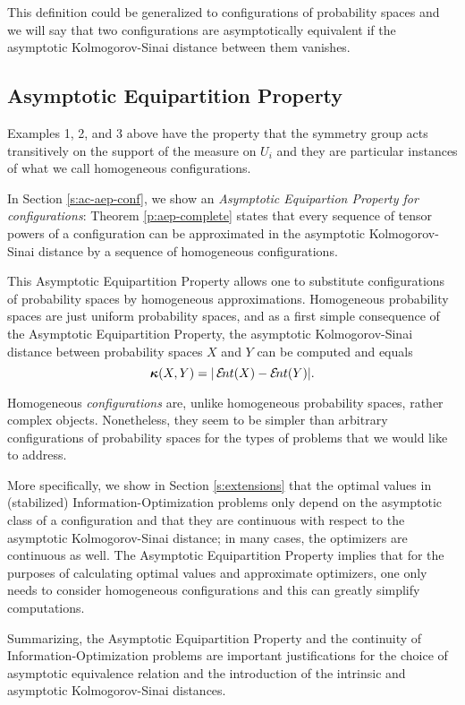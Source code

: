 This definition could be generalized to configurations of probability
spaces and we will say that two configurations are asymptotically
equivalent if the asymptotic Kolmogorov-Sinai distance between them
vanishes.

\subsection{Asymptotic Equipartition Property}\label{s:intro-aep}  
Examples 1, 2, and 3 above have the property that the symmetry group
acts transitively on the support of the measure on $U_{i}$ and they
are particular instances of what we call homogeneous configurations.

In Section \ref{s:ac-aep-conf}, we show an \emph{Asymptotic
  Equipartion Property for configurations}: Theorem
\ref{p:aep-complete} states that every sequence of tensor powers of a
configuration can be approximated in the asymptotic Kolmogorov-Sinai
distance by a sequence of homogeneous configurations.

This Asymptotic Equipartition Property allows one to substitute
configurations of probability spaces by homogeneous approximations.
Homogeneous probability spaces are just uniform probability spaces,
and as a first simple consequence of the Asymptotic Equipartition
Property, the asymptotic Kolmogorov-Sinai distance between probability
spaces $X$ and $Y$ can be computed and equals
\[
\aikd(X , Y) = |\ent(X) - \ent(Y)|.
\]

Homogeneous \emph{configurations} are, unlike homogeneous probability
spaces, rather complex objects.  Nonetheless, they seem to be simpler
than arbitrary configurations of probability spaces for the types of
problems that we would like to address.

More specifically, we show in Section \ref{s:extensions} that the
optimal values in (stabilized) Information-Optimization problems only
depend on the asymptotic class of a configuration and that they are
continuous with respect to the asymptotic Kolmogorov-Sinai distance;
in many cases, the optimizers are continuous as well.  The Asymptotic
Equipartition Property implies that for the purposes of calculating
optimal values and approximate optimizers, one only needs to consider
homogeneous configurations and this can greatly simplify computations.

Summarizing, the Asymptotic Equipartition Property and the continuity
of Information-Optimization problems are important justifications for
the choice of asymptotic equivalence relation and the introduction of
the intrinsic and asymptotic Kolmogorov-Sinai distances.

